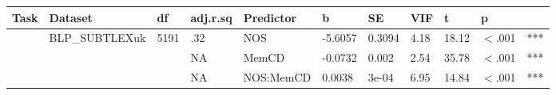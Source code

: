 \begin{table}[ht]
\centering
\begingroup\normalsize
\begin{tabular}{lllllllllll}
  \hline
Task & Dataset & df & adj.r.sq & Predictor & b & SE & VIF & t & p &  \\ 
  \hline
 & BLP\_SUBTLEXuk & 5191 & .32 & NOS & -5.6057 & 0.3094 & 4.18 & 18.12 & $<$.001 & *** \\ 
   &  &  & NA & MemCD & -0.0732 & 0.002 & 2.54 & 35.78 & $<$.001 & *** \\ 
   &  &  & NA & NOS:MemCD & 0.0038 & 3e-04 & 6.95 & 14.84 & $<$.001 & *** \\ 
   \hline
\end{tabular}
\endgroup
\end{table}
